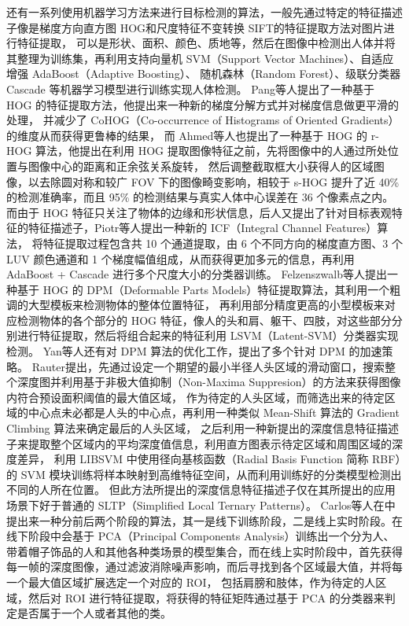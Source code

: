 还有一系列使用机器学习方法来进行目标检测的算法，一般先通过特定的特征描述子像是梯度方向直方图 HOG\cite{18}和尺度特征不变转换 SIFT\cite{19}的特征提取方法对图片进行特征提取，
可以是形状、面积、颜色、质地等，然后在图像中检测出人体并将其整理为训练集，再利用支持向量机 SVM（Support Vector Machines）、自适应增强 AdaBoost（Adaptive Boosting）、
随机森林（Random Forest）、级联分类器 Cascade 等机器学习模型进行训练实现人体检测。
Pang等人\cite{20}提出了一种基于 HOG 的特征提取方法，他提出来一种新的梯度分解方式并对梯度信息做更平滑的处理，
并减少了 CoHOG（Co-occurrence of Histograms of Oriented Gradients）的维度从而获得更鲁棒的结果，
而 Ahmed等人\cite{21}也提出了一种基于 HOG 的 r-HOG 算法，他提出在利用 HOG 提取图像特征之前，先将图像中的人通过所处位置与图像中心的距离和正余弦关系旋转，
然后调整截取框大小获得人的区域图像，以去除圆对称和较广 FOV 下的图像畸变影响，相较于 s-HOG 提升了近 40\% 的检测准确率，而且 95\% 的检测结果与真实人体中心误差在 36 个像素点之内。
而由于 HOG 特征只关注了物体的边缘和形状信息，后人又提出了针对目标表观特征的特征描述子，Piotr等人\cite{22}提出一种新的 ICF（Integral Channel Features）算法，
将特征提取过程包含共 10 个通道提取，由 6 个不同方向的梯度直方图、3 个 LUV 颜色通道和 1 个梯度幅值组成，从而获得更加多元的信息，再利用 AdaBoost + Cascade 进行多个尺度大小的分类器训练。
Felzenszwalb等人\cite{23}提出一种基于 HOG 的 DPM（Deformable Parts Models）特征提取算法，其利用一个粗调的大型模板来检测物体的整体位置特征，
再利用部分精度更高的小型模板来对应检测物体的各个部分的 HOG 特征，像人的头和肩、躯干、四肢，对这些部分分别进行特征提取，然后将组合起来的特征利用 LSVM（Latent-SVM）分类器实现检测。
Yan等人\cite{24}还有对 DPM 算法的优化工作，提出了多个针对 DPM 的加速策略。
Rauter\cite{25}提出，先通过设定一个期望的最小半径人头区域的滑动窗口，搜索整个深度图并利用基于非极大值抑制（Non-Maxima Suppresion）的方法来获得图像内符合预设面积阈值的最大值区域，
作为待定的人头区域，而筛选出来的待定区域的中心点未必都是人头的中心点，再利用一种类似 Mean-Shift 算法\cite{26}的 Gradient Climbing 算法来确定最后的人头区域，
之后利用一种新提出的深度信息特征描述子来提取整个区域内的平均深度值信息，利用直方图表示待定区域和周围区域的深度差异，
利用 LIBSVM 中使用径向基核函数（Radial Basis Function 简称 RBF）的 SVM 模块训练将样本映射到高维特征空间，从而利用训练好的分类模型检测出不同的人所在位置。
但此方法所提出的深度信息特征描述子仅在其所提出的应用场景下好于普通的 SLTP（Simplified Local Ternary Patterns）\cite{27}。
Carlos等人在\cite{28}中提出来一种分前后两个阶段的算法，其一是线下训练阶段，二是线上实时阶段。在线下阶段中会基于 PCA（Principal Components Analysis）训练出一个分为人、
带着帽子饰品的人和其他各种类场景的模型集合，而在线上实时阶段中，首先获得每一帧的深度图像，通过滤波消除噪声影响，而后寻找到各个区域最大值，并将每一个最大值区域扩展选定一个对应的 ROI，
包括肩膀和肢体，作为待定的人区域，然后对 ROI 进行特征提取，将获得的特征矩阵通过基于 PCA 的分类器来判定是否属于一个人或者其他的类。

